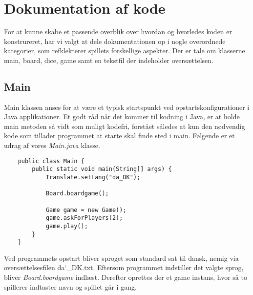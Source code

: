 \chapter{Dokumentation af kode}

\noindent For at kunne skabe et passende overblik over hvordan og hvorledes koden er konstrureret, har vi valgt at dele dokumentationen op i nogle overordnede kategorier, som refklekterer spillets forskellige aspekter. Der er tale om klasserne main, board, dice, game samt en tekstfil der indeholder oversættelsen.\\

\section{Main}
\noindent Main klassen anses for at være et typisk startspunkt ved opstartskonfigurationer i Java applikationer. Et godt råd når det kommer til kodning i Java, er at holde main metoden så vidt som muligt kodefri, forstået således at kun den nødvendig kode som tillader programmet at starte skal finde sted i main. Følgende er et udrag af vores \textit{Main.java} klasse.\\

\begin{lstlisting}
    public class Main {
        public static void main(String[] args) {
            Translate.setLang("da_DK");
    
            Board.boardgame();
    
            Game game = new Game();
            game.askForPlayers(2);
            game.play();
        }
    }    
\end{lstlisting}
\vspace{2ex}

\noindent Ved programmets opstart bliver sproget som standard sat til dansk, nemig via oversættelsesfilen da\char`_DK.txt. Eftersom programmet indstiller det valgte sprog, bliver \textit{Board.boardgame} indlæst. Derefter oprettes der et game instans, hvor så to spillerer indtaster navn og spillet går i gang.\\

